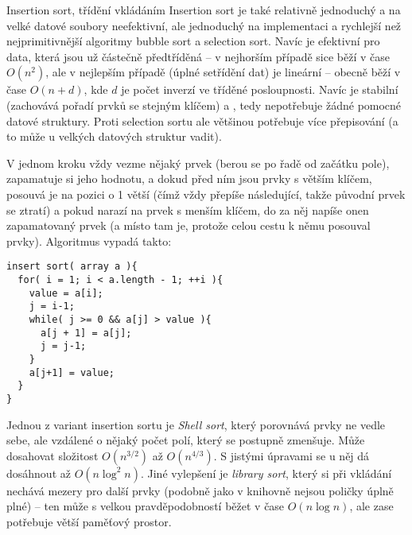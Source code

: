 \begin{algoritmusN}{Insertion sort, třídění vkládáním}
Insertion sort je také relativně jednoduchý a na velké datové soubory neefektivní, ale jednoduchý na implementaci a rychlejší než nejprimitivnější algoritmy bubble sort a selection sort. Navíc je efektivní pro data, která jsou už částečně předtříděná -- v nejhorším případě sice běží v čase $O(n^2)$, ale v nejlepším případě (úplné setřídění dat) je lineární -- obecně běží v čase $O(n+d)$, kde $d$ je počet inverzí ve tříděné posloupnosti. Navíc je stabilní (zachovává pořadí prvků se stejným klíčem) a , tedy nepotřebuje žádné pomocné datové struktury. Proti selection sortu ale většinou potřebuje více přepisování (a to může u velkých datových struktur vadit).

V jednom kroku vždy vezme nějaký prvek (berou se po řadě od začátku pole), zapamatuje si jeho hodnotu, a dokud před ním jsou prvky s větším klíčem, posouvá je na pozici o 1 větší (čímž vždy přepíše následující, takže původní prvek se ztratí) a pokud narazí na prvek s menším klíčem, do za něj napíše onen zapamatovaný prvek (a místo tam je, protože celou cestu k němu posouval prvky). Algoritmus vypadá takto:
\begin{verbatim}
insert sort( array a ){
  for( i = 1; i < a.length - 1; ++i ){
    value = a[i];
    j = i-1;
    while( j >= 0 && a[j] > value ){ 
      a[j + 1] = a[j];
      j = j-1;
    }
    a[j+1] = value;
  }
}
\end{verbatim}

Jednou z variant insertion sortu je \emph{Shell sort}, který porovnává prvky ne vedle sebe, ale vzdálené o nějaký počet polí, který se postupně zmenšuje. Může dosahovat složitost $O(n^{3/2})$ až $O(n^{4/3})$. S jistými úpravami se u něj dá dosáhnout až $O(n\log^2 n)$. Jiné vylepšení je \emph{library sort}, který si při vkládání nechává mezery pro další prvky (podobně jako v knihovně nejsou poličky úplně plné) -- ten může s velkou pravděpodobností běžet v čase $O(n\log n)$, ale zase potřebuje větší paměťový prostor.
\end{algoritmusN}

